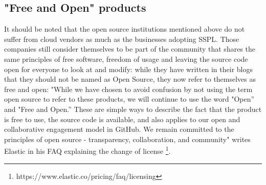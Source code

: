 \documentclass[12pt, a4paper]{article}
\begin{document}
  \pagebreak
  \subsection{"Free and Open" products}
  It should be noted that the open source institutions mentioned above do not suffer from cloud vendors as much as the businesses adopting SSPL. Those companies still consider themselves to be part of the community that shares the same principles of free software, freedom of usage and leaving the source code open for everyone to look at and modify: while they have written in their blogs that they should not be named as Open Source, they now refer to themselves as free and open: "While we have chosen to avoid confusion by not using the term open source to refer to these products, we will continue to use the word "Open” and "Free and Open.” These are simple ways to describe the fact that the product is free to use, the source code is available, and also applies to our open and collaborative engagement model in GitHub. We remain committed to the principles of open source - transparency, collaboration, and community" writes Elastic in his FAQ explaining the change of license \footnote{https://www.elastic.co/pricing/faq/licensing}.

\end{document}
